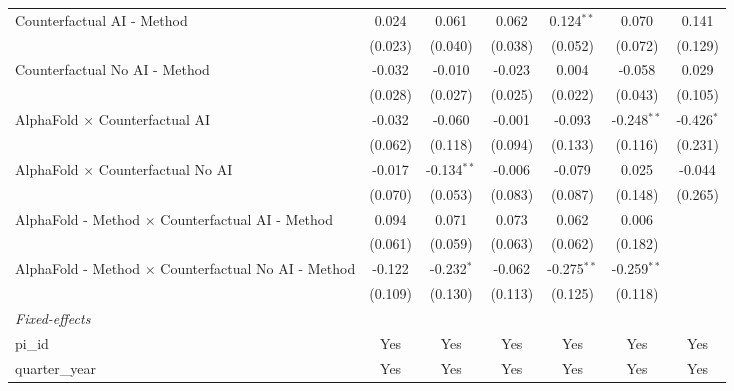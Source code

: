 \begin{tabular}{lcccccc}
   Counterfactual AI - Method                                 & 0.024   & 0.061         & 0.062   & 0.124$^{**}$  & 0.070         & 0.141\\   
                                                              & (0.023) & (0.040)       & (0.038) & (0.052)       & (0.072)       & (0.129)\\   
   Counterfactual No AI - Method                              & -0.032  & -0.010        & -0.023  & 0.004         & -0.058        & 0.029\\   
                                                              & (0.028) & (0.027)       & (0.025) & (0.022)       & (0.043)       & (0.105)\\   
   AlphaFold $\times$ Counterfactual AI                       & -0.032  & -0.060        & -0.001  & -0.093        & -0.248$^{**}$ & -0.426$^{*}$\\   
                                                              & (0.062) & (0.118)       & (0.094) & (0.133)       & (0.116)       & (0.231)\\   
   AlphaFold $\times$ Counterfactual No AI                    & -0.017  & -0.134$^{**}$ & -0.006  & -0.079        & 0.025         & -0.044\\   
                                                              & (0.070) & (0.053)       & (0.083) & (0.087)       & (0.148)       & (0.265)\\   
   AlphaFold - Method $\times$ Counterfactual AI - Method     & 0.094   & 0.071         & 0.073   & 0.062         & 0.006         &   \\   
                                                              & (0.061) & (0.059)       & (0.063) & (0.062)       & (0.182)       &   \\   
   AlphaFold - Method $\times$ Counterfactual No AI - Method  & -0.122  & -0.232$^{*}$  & -0.062  & -0.275$^{**}$ & -0.259$^{**}$ &   \\   
                                                              & (0.109) & (0.130)       & (0.113) & (0.125)       & (0.118)       &   \\   
   \midrule
   \emph{Fixed-effects}\\
   pi\_id                                                     & Yes     & Yes           & Yes     & Yes           & Yes           & Yes\\  
   quarter\_year                                              & Yes     & Yes           & Yes     & Yes           & Yes           & Yes\\  

\end{tabular}
